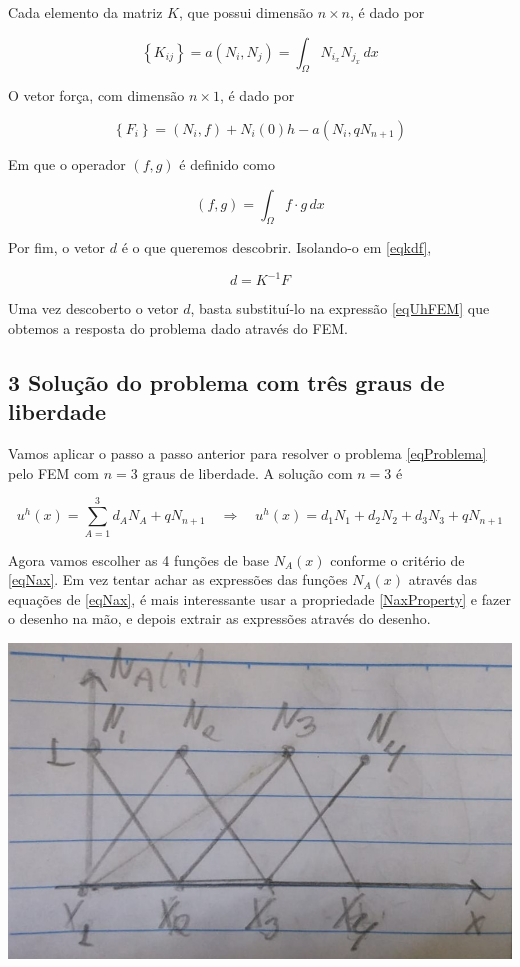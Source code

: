 \documentclass[12pt]{scrartcl}
\newcommand{\logo}{\quad \Rightarrow \quad}
\begin{document}
Cada elemento da matriz $K$, que possui dimensão $n \times  n$, é dado por

\[
    \left\{K_{ij}\right\} = a\left(N_i, N_j\right) = \int_{\Omega} N_{i_x} N_{j_x} \, dx
\]

O vetor força, com dimensão $n \times 1$, é dado por

\[
    \left\{F_{i}\right\} = \left(N_i, f\right) + N_i(0)h - a\left(N_i, qN_{n+1}\right)
\]

Em que o operador $\left(f, g\right)$ é definido como

\[
    \left(f, g\right) = \int_{\Omega} f \cdot g \, dx
\]

Por fim, o vetor $d$ é o que queremos descobrir. Isolando-o em \eqref{eqkdf},

\begin{equation}\label{eqdkf}
    d = K^{-1}F
\end{equation}

Uma vez descoberto o vetor $d$, basta substituí-lo na expressão \eqref{eqUhFEM} que obtemos a resposta do problema dado através do FEM.

\subsection*{3 Solução do problema com três graus de liberdade}

Vamos aplicar o passo a passo anterior para resolver o problema \eqref{eqProblema} pelo FEM com $n = 3$ graus de liberdade.
A solução com $n = 3$ é

\[
    u^h(x) = \sum_{A=1}^3 d_AN_A + qN_{n+1}
    \logo
    u^h(x) = d_1N_1 + d_2N_2 + d_3N_3 + qN_{n+1}
\]

Agora vamos escolher as 4 funções de base $N_A(x)$ conforme o critério de \eqref{eqNax}. Em vez tentar achar as expressões das funções
$N_A(x)$ através das equações de \eqref{eqNax}, é mais interessante usar a propriedade \eqref{NaxProperty} e fazer o desenho na mão,
e depois extrair as expressões através do desenho.

\begin{center}
    \includegraphics[scale=0.5]{AA03_Nax.jpeg}
\end{center}
\end{document}
